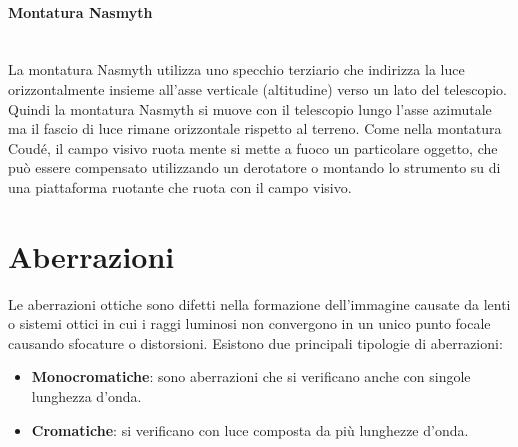 \documentclass[a4paper, oneside]{book}
\begin{document}
\paragraph{Montatura Nasmyth} \mbox{} \\ \noindent
La montatura Nasmyth utilizza uno specchio terziario che indirizza la luce orizzontalmente insieme all'asse verticale (altitudine) 
verso un lato del telescopio. Quindi la montatura Nasmyth si muove con il telescopio lungo l'asse azimutale ma il fascio di luce
rimane orizzontale rispetto al terreno. Come nella montatura Coudé, il campo visivo ruota mente si mette a fuoco un particolare oggetto,
che può essere compensato utilizzando un derotatore o montando lo strumento su di una piattaforma ruotante che ruota con il campo visivo.

\section{Aberrazioni}
Le aberrazioni ottiche sono difetti nella formazione dell'immagine causate da lenti 
o sistemi ottici in cui i raggi luminosi non convergono in un unico punto focale
causando sfocature o distorsioni. Esistono
due principali tipologie di aberrazioni:
\begin{itemize}
    \item \textbf{Monocromatiche}: sono aberrazioni che si verificano anche con singole lunghezza d'onda.
    \item \textbf{Cromatiche}: si verificano con luce composta da più lunghezze d'onda.
\end{itemize}
\end{document}
